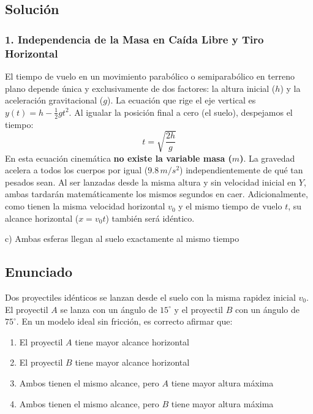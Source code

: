 \documentclass[12pt, a4paper]{article}
\begin{document}
\subsection*{Solución}

\subsubsection*{1. Independencia de la Masa en Caída Libre y Tiro Horizontal}
El tiempo de vuelo en un movimiento parabólico o semiparabólico en terreno plano depende única y exclusivamente de dos factores: la altura inicial ($h$) y la aceleración gravitacional ($g$). 
La ecuación que rige el eje vertical es $y(t) = h - \frac{1}{2}gt^2$.
Al igualar la posición final a cero (el suelo), despejamos el tiempo:
$$ t = \sqrt{\frac{2h}{g}} $$
En esta ecuación cinemática \textbf{no existe la variable masa ($m$)}. La gravedad acelera a todos los cuerpos por igual ($9.8\,\si{m/s^2}$) independientemente de qué tan pesados sean. Al ser lanzadas desde la misma altura y sin velocidad inicial en $Y$, ambas tardarán matemáticamente los mismos segundos en caer.
Adicionalmente, como tienen la misma velocidad horizontal $v_0$ y el mismo tiempo de vuelo $t$, su alcance horizontal ($x = v_0 t$) también será idéntico.

\begin{tcolorbox}[colback=green!5!white, colframe=green!50!black, title=Respuesta Final]
\centering \Large c) Ambas esferas llegan al suelo exactamente al mismo tiempo
\end{tcolorbox}

\newpage

\subsection*{Enunciado}
Dos proyectiles idénticos se lanzan desde el suelo con la misma rapidez inicial $v_0$. El proyectil $A$ se lanza con un ángulo de $15^\circ$ y el proyectil $B$ con un ángulo de $75^\circ$. En un modelo ideal sin fricción, es correcto afirmar que:
\begin{enumerate}[label=\alph*)]
    \item El proyectil $A$ tiene mayor alcance horizontal
    \item El proyectil $B$ tiene mayor alcance horizontal
    \item Ambos tienen el mismo alcance, pero $A$ tiene mayor altura máxima
    \item Ambos tienen el mismo alcance, pero $B$ tiene mayor altura máxima
\end{enumerate}
\end{document}

